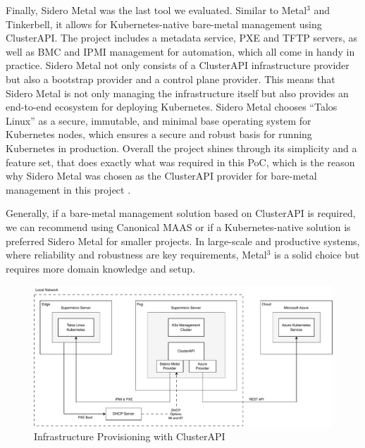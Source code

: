         Finally, Sidero Metal was the last tool we evaluated. Similar to Metal$^3$ and Tinkerbell, it allows for Kubernetes-native bare-metal management using ClusterAPI. The project includes a metadata service, PXE and TFTP servers, as well as BMC and IPMI management for automation, which all come in handy in practice. Sidero Metal not only consists of a ClusterAPI infrastructure provider but also a bootstrap provider and a control plane provider. This means that Sidero Metal is not only managing the infrastructure itself but also provides an end-to-end ecosystem for deploying Kubernetes. Sidero Metal chooses ``Talos Linux'' as a secure, immutable, and minimal base operating system for Kubernetes nodes, which ensures a secure and robust basis for running Kubernetes in production. Overall the project shines through its simplicity and a feature set, that does exactly what was required in this PoC, which is the reason why Sidero Metal was chosen as the ClusterAPI provider for bare-metal management in this project \cite{siderometal, taloslinux}.\newline

        Generally, if a bare-metal management solution based on ClusterAPI is required, we can recommend using Canonical MAAS or if a Kubernetes-native solution is preferred Sidero Metal for smaller projects. In large-scale and productive systems, where reliability and robustness are key requirements, Metal$^3$ is a solid choice but requires more domain knowledge and setup.\newline

        \begin{figure}[htbp]
            \centering
            \includegraphics[width=\textwidth]{img/provisioning-infrastructure.pdf}
            \caption{Infrastructure Provisioning with ClusterAPI}
            \label{figure:capi-infra-provisioning}
        \end{figure}

